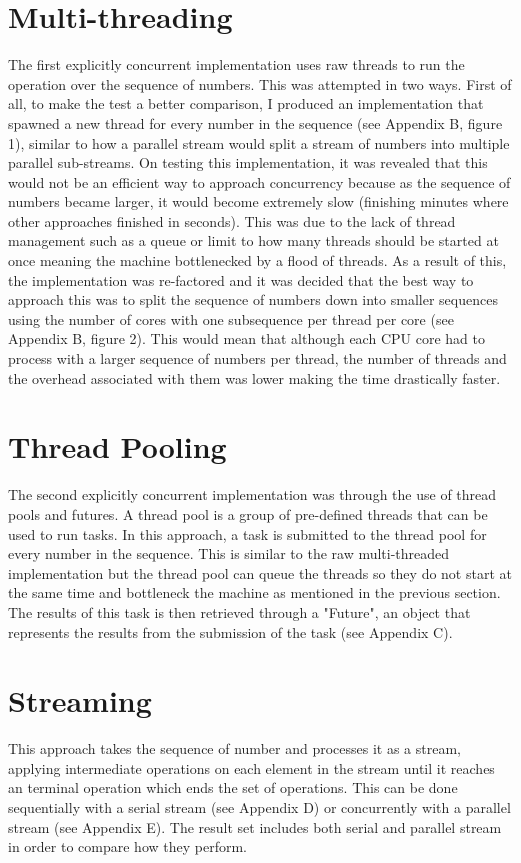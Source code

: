\documentclass[]{report}
\begin{document}
\section{Multi-threading}
The first explicitly concurrent implementation uses raw threads to run the operation over the sequence of numbers. This was attempted in two ways. First of all, to make the test a better comparison, I produced an implementation that spawned a new thread for every number in the sequence (see Appendix B, figure 1), similar to how a parallel stream would split a stream of numbers into multiple parallel sub-streams. On testing this implementation, it was revealed that this would not be an efficient way to approach concurrency because as the sequence of numbers became larger, it would become extremely slow (finishing minutes where other approaches finished in seconds). This was due to the lack of thread management such as a queue or limit to how many threads should be started at once meaning the machine bottlenecked by a flood of threads. As a result of this, the implementation was re-factored and it was decided that the best way to approach this was to split the sequence of numbers down into smaller sequences using the number of cores with one subsequence per thread per core (see Appendix B, figure 2). This would mean that although each CPU core had to process with a larger sequence of numbers per thread, the number of threads and the overhead associated with them was lower making the time drastically faster.
 
\section{Thread Pooling}
The second explicitly concurrent implementation was through the use of thread pools and futures. A thread pool is a group of pre-defined threads that can be used to run tasks. In this approach, a task is submitted to the thread pool for every number in the sequence. This is similar to the raw multi-threaded implementation but the thread pool can queue the threads so they do not start at the same time and bottleneck the machine as mentioned in the previous section. The results of this task is then retrieved through a "Future", an object that represents the results from the submission of the task (see Appendix C).

\section{Streaming}
This approach takes the sequence of number and processes it as a stream, applying intermediate operations on each element in the stream until it reaches an terminal operation which ends the set of operations. This can be done sequentially with a serial stream (see Appendix D) or concurrently with a parallel stream (see Appendix E). The result set includes both serial and parallel stream in order to compare how they perform.
\end{document}
